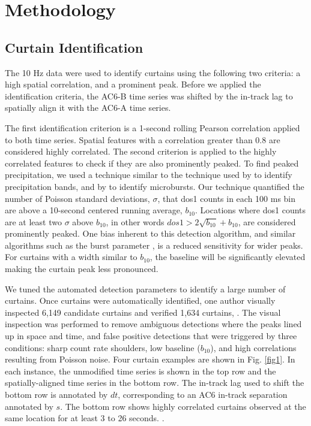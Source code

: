 \documentclass[draft]{agujournal2019}
\begin{document}
\section{Methodology} 
\subsection{Curtain Identification} \label{curtain_identification}
The 10 Hz data were used to identify curtains using the following two criteria: a high spatial correlation, and a prominent peak. Before we applied the identification criteria, the AC6-B time series was shifted by the in-track lag to spatially align it with the AC6-A time series. 

The first identification criterion is a 1-second rolling Pearson correlation applied to both time series. Spatial features with a correlation greater than 0.8 are considered highly correlated. The second criterion is applied to the highly correlated features to check if they are also prominently peaked. To find peaked precipitation, we used a technique similar to the technique used by  to identify precipitation bands, and by  to identify microbursts. Our technique quantified the number of Poisson standard deviations, $\sigma$, that dos1 counts in each 100 ms bin are above a 10-second centered running average, $b_{10}$. Locations where dos1 counts are at least two $\sigma$ above $b_{10}$, in other words $dos1 > 2\sqrt{b_{10}} + b_{10}$, are considered prominently peaked. One bias inherent to this detection algorithm, and similar algorithms such as the burst parameter \cite{O'Brien2003}, is a reduced sensitivity for wider peaks. For curtains with a width similar to $b_{10}$, the baseline will be significantly elevated making the curtain peak less pronounced. 

We tuned the automated detection parameters to identify a large number of curtains. Once curtains were automatically identified, one author visually inspected 6,149 candidate curtains and verified 1,634 curtains, . The visual inspection was performed to remove ambiguous detections where the peaks lined up in  space and time, and false positive detections that were triggered by three conditions: sharp count rate shoulders, low baseline ($b_{10}$), and high correlations resulting from Poisson noise. Four curtain examples are shown in Fig. \ref{fig1}. In each instance, the unmodified time series is shown in the top row and the spatially-aligned time series in the bottom row. The in-track lag used to shift the bottom row is annotated by $dt$, corresponding to an AC6 in-track separation annotated by $s$. The bottom row shows highly correlated curtains observed at the same location for at least 3 to 26 seconds. .
\end{document}
